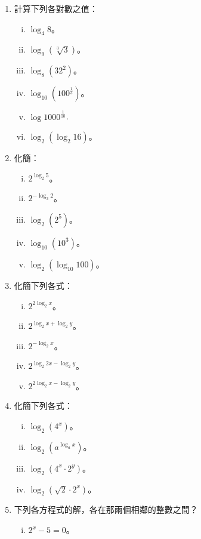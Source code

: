 \begin{enumerate}
    \item 計算下列各對數之值：
    \begin{enumerate}[(i)]
        \item $\log_4 8$。
        \item $\log_9(\sqrt[3]{3})$。
        \item $\log_8(32^2)$。
        \item $\log_{10}(100^{\frac{1}{3}})$。
        \item $\log 1000^{\frac{1}{10}}$\label{note:b2-ch4-p98-log-base}.
        \item $\log_2(\log_2 16)$。
    \end{enumerate}
    \item 化簡：
    \begin{enumerate}[(i)]
        \item $2^{\log_2 5}$。
        \item $2^{-\log_3 2}$。
        \item $\log_2(2^5)$。
        \item $\log_{10}(10^3)$。
        \item $\log_2(\log_{10} 100)$。
    \end{enumerate}
    \item 化簡下列各式：
    \begin{enumerate}[(i)]
        \item $2^{2\log_2 x}$。
        \item $2^{\log_2 x + \log_2 y}$。
        \item $2^{-\log_2 x}$。
        \item $2^{\log_2 2x - \log_2 y}$。
        \item $2^{2\log_2 x - \log_2 y}$。
    \end{enumerate}
    \item 化簡下列各式：
    \begin{enumerate}[(i)]
        \item $\log_2(4^x)$。
        \item $\log_2(a^{\log_a x})$。
        \item $\log_2(4^x \cdot 2^y)$。
        \item $\log_2(\sqrt{2}\cdot 2^x)$。
    \end{enumerate}
    \item 下列各方程式的解，各在那兩個相鄰的整數之間？
    \begin{enumerate}[(i)]
        \item $2^x - 5 = 0$。

\end{enumerate}
\end{enumerate}
